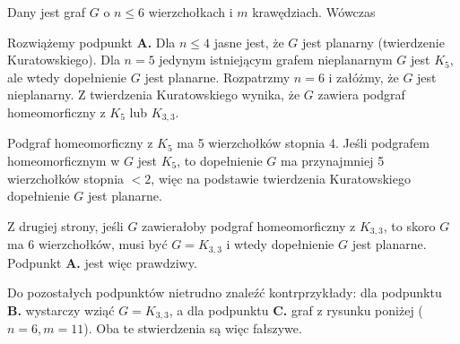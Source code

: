 \begin{exam}
    Dany jest graf $G$ o $n \leq 6$ wierzchołkach i $m$ krawędziach. Wówczas
    \bigskip

    Rozwiążemy podpunkt \textbf{A.} Dla $n \leq 4$ jasne jest, że $G$ jest planarny (twierdzenie Kuratowskiego). Dla $n = 5$ jedynym istniejącym grafem nieplanarnym $G$ jest $K_5$, ale wtedy dopełnienie $G$ jest planarne. Rozpatrzmy $n = 6$ i załóżmy, że $G$ jest nieplanarny. Z twierdzenia Kuratowskiego wynika, że $G$ zawiera podgraf homeomorficzny z $K_5$ lub $K_{3, 3}$.
    
    Podgraf homeomorficzny z $K_5$ ma 5 wierzchołków stopnia 4. Jeśli podgrafem homeomorficznym w $G$ jest $K_5$, to dopełnienie $G$ ma przynajmniej 5 wierzchołków stopnia $< 2$, więc na podstawie twierdzenia Kuratowskiego dopełnienie $G$ jest planarne.

    Z drugiej strony, jeśli $G$ zawierałoby podgraf homeomorficzny z $K_{3,3}$, to skoro $G$ ma 6 wierzchołków, musi być $G = K_{3,3}$ i wtedy dopełnienie $G$ jest planarne. Podpunkt \textbf{A.} jest więc prawdziwy.
    \bigskip

    Do pozostałych podpunktów nietrudno znaleźć kontrprzykłady: dla podpunktu \textbf{B.} wystarczy wziąć $G = K_{3,3}$, a dla podpunktu \textbf{C.} graf z rysunku poniżej ($n = 6, m = 11$). Oba te stwierdzenia są więc fałszywe.
    
    \begin{center}
    \end{center}
\end{exam}

